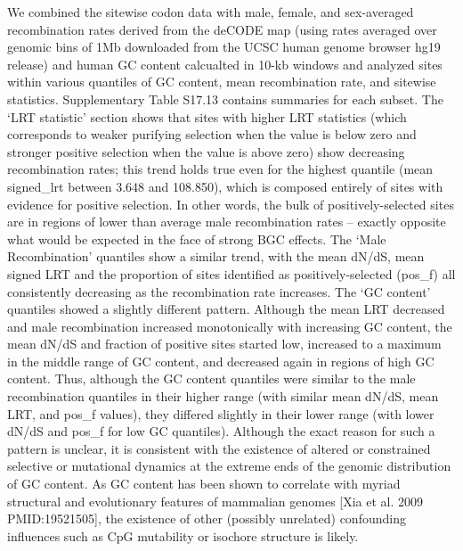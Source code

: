 We combined the sitewise codon data with male, female, and
sex-averaged recombination rates derived from the deCODE map (using
rates averaged over genomic bins of 1Mb downloaded from the UCSC human
genome browser hg19 release) and human GC content calcualted in 10-kb
windows and analyzed sites within various quantiles of GC content,
mean recombination rate, and sitewise statistics. Supplementary Table
S17.13 contains summaries for each subset. The ‘LRT statistic’ section
shows that sites with higher LRT statistics (which corresponds to
weaker purifying selection when the value is below zero and stronger
positive selection when the value is above zero) show decreasing
recombination rates; this trend holds true even for the highest
quantile (mean signed_lrt between 3.648 and 108.850), which is
composed entirely of sites with evidence for positive selection. In
other words, the bulk of positively-selected sites are in regions of
lower than average male recombination rates -- exactly opposite what
would be expected in the face of strong BGC effects. The ‘Male
Recombination’ quantiles show a similar trend, with the mean dN/dS,
mean signed LRT and the proportion of sites identified as
positively-selected (pos_f) all consistently decreasing as the
recombination rate increases. The ‘GC content’ quantiles showed a
slightly different pattern. Although the mean LRT decreased and male
recombination increased monotonically with increasing GC content, the
mean dN/dS and fraction of positive sites started low, increased to a
maximum in the middle range of GC content, and decreased again in
regions of high GC content. Thus, although the GC content quantiles
were similar to the male recombination quantiles in their higher range
(with similar mean dN/dS, mean LRT, and pos_f values), they differed
slightly in their lower range (with lower dN/dS and pos_f for low GC
quantiles). Although the exact reason for such a pattern is unclear,
it is consistent with the existence of altered or constrained
selective or mutational dynamics at the extreme ends of the genomic
distribution of GC content. As GC content has been shown to correlate
with myriad structural and evolutionary features of mammalian genomes
[Xia et al. 2009 PMID:19521505], the existence of other (possibly
unrelated) confounding influences such as CpG mutability or isochore
structure is likely.

